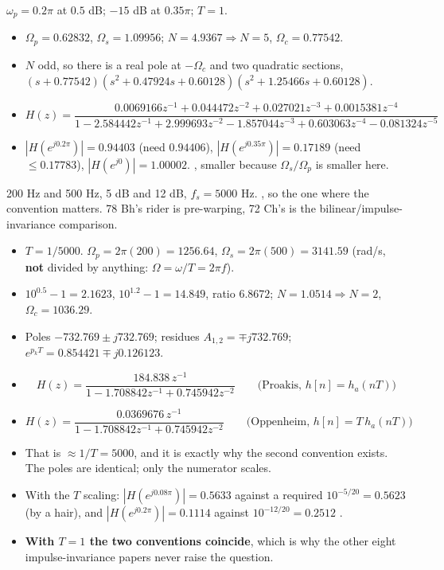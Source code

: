 {\color{sub}\footnotesize $\omega_p=0.2\pi$ at $0.5$ dB; $-15$ dB at $0.35\pi$; $T=1$.}
\begin{itemize}
  \item $\Omega_p=0.62832$, $\Omega_s=1.09956$; $N=4.9367\Rightarrow\boxed{N=5}$,
        $\Omega_c=0.77542$.
  \item $N$ odd, so there is a real pole at $-\Omega_c$ and two quadratic sections,
        $(s+0.77542)(s^2+0.47924s+0.60128)(s^2+1.25466s+0.60128)$.
  \item[] \[ H(z)=\frac{0.0069166z^{-1}+0.044472z^{-2}+0.027021z^{-3}+0.0015381z^{-4}}
             {1-2.584442z^{-1}+2.999693z^{-2}-1.857044z^{-3}+0.603063z^{-4}
              -0.081324z^{-5}} \]
  \item $|H(e^{j0.2\pi})|=0.94403$ (need $0.94406$), $|H(e^{j0.35\pi})|=0.17189$
        (need $\le0.17783$), $|H(e^{j0})|=1.00002$. , smaller because $\Omega_s/\Omega_p$ is smaller here.
\end{itemize}

{\color{sub}\footnotesize 200 Hz and 500 Hz, 5 dB and 12 dB, $f_s=5000$ Hz.
, so the one where the convention
matters. 78 Bh's rider is pre-warping, 72 Ch's is the bilinear/impulse-invariance
comparison.}
\begin{itemize}
  \item $T=1/5000$. $\Omega_p=2\pi(200)=1256.64$, $\Omega_s=2\pi(500)=3141.59$
        (rad/s, \textbf{not} divided by anything: $\Omega=\omega/T=2\pi f$).
  \item $10^{0.5}-1=2.1623$, $10^{1.2}-1=14.849$, ratio $6.8672$;
        $N=1.0514\Rightarrow\boxed{N=2}$, $\Omega_c=1036.29$.
  \item Poles $-732.769\pm j732.769$; residues $A_{1,2}=\mp j732.769$;
        $e^{p_kT}=0.854421\mp j0.126123$.
  \item[] \[ H(z)=\frac{184.838\,z^{-1}}{1-1.708842z^{-1}+0.745942z^{-2}}
             \qquad\text{(Proakis, } h[n]=h_a(nT)\text{)} \]
  \item[] \[ H(z)=\frac{0.0369676\,z^{-1}}{1-1.708842z^{-1}+0.745942z^{-2}}
             \qquad\text{(Oppenheim, } h[n]=T\,h_a(nT)\text{)} \]
  \item {} That is $\approx1/T=5000$, and it is
        exactly why the second convention exists. The poles are identical; only the
        numerator scales.
  \item With the $T$ scaling: $|H(e^{j0.08\pi})|=0.5633$ against a required
        $10^{-5/20}=0.5623$ \checkmark (by a hair), and $|H(e^{j0.2\pi})|=0.1114$
        against $10^{-12/20}=0.2512$ \checkmark.
  \item \textbf{With $T=1$ the two conventions coincide}, which is why the other eight
        impulse-invariance papers never raise the question. 
\end{itemize}

